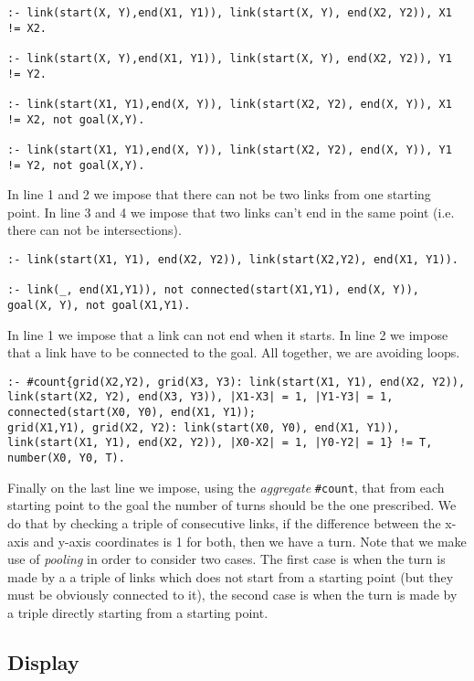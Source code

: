 \begin{verbatim}
:- link(start(X, Y),end(X1, Y1)), link(start(X, Y), end(X2, Y2)), X1 != X2. 

:- link(start(X, Y),end(X1, Y1)), link(start(X, Y), end(X2, Y2)), Y1 != Y2. 

:- link(start(X1, Y1),end(X, Y)), link(start(X2, Y2), end(X, Y)), X1 != X2, not goal(X,Y). 

:- link(start(X1, Y1),end(X, Y)), link(start(X2, Y2), end(X, Y)), Y1 != Y2, not goal(X,Y). 
\end{verbatim}

In line 1 and 2 we impose that there can not be two links from one starting point. In line 3 and 4 we impose that two links can't end in the same point (i.e. there can not be intersections).
\begin{verbatim}
:- link(start(X1, Y1), end(X2, Y2)), link(start(X2,Y2), end(X1, Y1)).

:- link(_, end(X1,Y1)), not connected(start(X1,Y1), end(X, Y)), goal(X, Y), not goal(X1,Y1). 
\end{verbatim}

In line 1 we  impose that a link can not end when it starts. In line 2 we impose that a link have to be connected to the goal. All together, we are avoiding loops.

\begin{verbatim}
:- #count{grid(X2,Y2), grid(X3, Y3): link(start(X1, Y1), end(X2, Y2)), link(start(X2, Y2), end(X3, Y3)), |X1-X3| = 1, |Y1-Y3| = 1, connected(start(X0, Y0), end(X1, Y1));
grid(X1,Y1), grid(X2, Y2): link(start(X0, Y0), end(X1, Y1)), link(start(X1, Y1), end(X2, Y2)), |X0-X2| = 1, |Y0-Y2| = 1} != T, number(X0, Y0, T).
\end{verbatim}

Finally on the last line we impose, using the \emph{aggregate} \texttt{#count}, that from each starting point to the goal the number of turns should be the one prescribed. We do that by checking a triple of consecutive links, if the difference between the x-axis and y-axis coordinates is 1 for both, then we have a turn.
 Note that we make use of \emph{pooling} in order to consider two cases. The first case is when the turn is made by a a triple of links which does not start from a starting point (but they must be obviously connected to it), the second case is when the turn is made by a triple directly starting from a starting point.

\subsection{Display}

